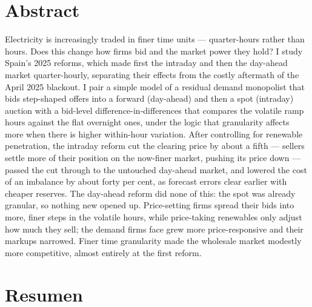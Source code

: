 \documentclass[11pt,a4paper]{article}
\theoremstyle{definition}
\theoremstyle{remark}
\theoremstyle{plain}
\begin{document}
\section*{Abstract}

\noindent Electricity is increasingly traded in finer time units --- quarter-hours rather than hours. Does this change how firms bid and the market power they hold? I study Spain's 2025 reforms, which made first the intraday and then the day-ahead market quarter-hourly, separating their effects from the costly aftermath of the April 2025 blackout. I pair a simple model of a residual demand monopolist that bids step-shaped offers into a forward (day-ahead) and then a spot (intraday) auction with a bid-level difference-in-differences that compares the volatile ramp hours against the flat overnight ones, under the logic that granularity affects more when there is higher within-hour variation. After controlling for renewable penetration, the intraday reform cut the clearing price by about a fifth --- sellers settle more of their position on the now-finer market, pushing its price down --- passed the cut through to the untouched day-ahead market, and lowered the cost of an imbalance by about forty per cent, as forecast errors clear earlier with cheaper reserves. The day-ahead reform did none of this: the spot was already granular, so nothing new opened up. Price-setting firms spread their bids into more, finer steps in the volatile hours, while price-taking renewables only adjust how much they sell; the demand firms face grew more price-responsive and their markups narrowed. Finer time granularity made the wholesale market modestly more competitive, almost entirely at the first reform.

\vspace{1.4cm}

\section*{Resumen}
\end{document}
